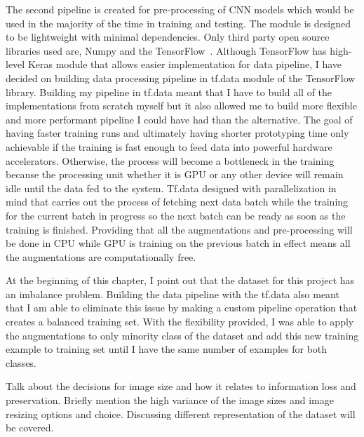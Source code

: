 The second pipeline is created for pre-processing of CNN models which would be used in the majority of the time in training and testing.
The module is designed to be lightweight with minimal dependencies. Only third party open source libraries used are, Numpy and the TensorFlow~\cite{tensorflow}.
Although TensorFlow has high-level Keras module that allows easier implementation for data pipeline, I have decided on building data processing pipeline in tf.data module of the TensorFlow library.
Building my pipeline in tf.data meant that I have to build all of the implementations from scratch myself but it also allowed me to build more flexible and more performant pipeline I could have had than the alternative. 
The goal of having faster training runs and ultimately having shorter prototyping time only achievable if the training is fast enough to feed data into powerful hardware accelerators.
Otherwise, the process will become a bottleneck in the training because the processing unit whether it is GPU or any other device will remain idle until the data fed to the system.
Tf.data designed with parallelization in mind that carries out the process of fetching next data batch while the training for the current batch in progress so the next batch can be ready as soon as the training is finished.
Providing that all the augmentations and pre-processing will be done in CPU while GPU is training on the previous batch in effect means all the augmentations are computationally free.


At the beginning of this chapter, I point out that the dataset for this project has an imbalance problem.
Building the data pipeline with the tf.data also meant that I am able to eliminate this issue by making a custom pipeline operation that creates a balanced training set.
With the flexibility provided, I was able to apply the augmentations to only minority class of the dataset and add this new training example to training set until I have the same number of examples for both classes.




Talk about the decisions for image size and how it relates to information loss and preservation. Briefly mention the high variance of the image sizes and image resizing options and choice.
Discussing different representation of the dataset will be covered.
\clearpage